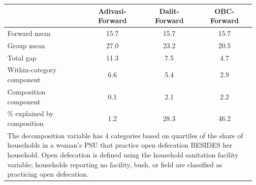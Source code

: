 \begin{tabular}{l*{3}{c}}
\hline\hline
            &\multicolumn{1}{c}{Adivasi-Forward}&\multicolumn{1}{c}{Dalit-Forward}&\multicolumn{1}{c}{OBC-Forward}\\
\hline
\hline
Forward mean&        15.7&        15.7&        15.7\\
Group mean  &        27.0&        23.2&        20.5\\
Total gap   &        11.3&         7.5&         4.7\\
Within-category component&         6.6&         5.4&         2.9\\
Composition component&         0.1&         2.1&         2.2\\
\% explained by composition&         1.2&        28.3&        46.2\\
\hline\hline
\multicolumn{4}{l}{\footnotesize \parbox[t]{0.95\linewidth}{The decomposition variable has 4 categories based on quartiles of the share of households in a woman's PSU that practice open defecation BESIDES her household. Open defecation is defined using the household sanitation facility variable; households reporting no facility, bush, or field are classified as practicing open defecation.}}\\
\end{tabular}
